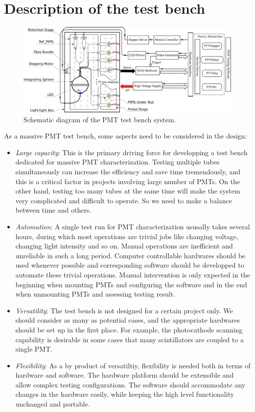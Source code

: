 \documentclass[5p, times]{elsarticle}
\begin{document}
\section{Description of the test bench}
\label{sec:description}

\begin{figure}
 \centering
 \includegraphics[width=160mm]{testbench_overview}
\caption{Schematic diagram of the PMT test bench system.}
\label{fig:testbench_overveiw}
\end{figure}

As a massive PMT test bench, some aspects need to be considered in the design:
\begin{itemize}
 \item \textit{Large capacity}: This is the primary driving force for developping a test bench dedicated for massive PMT characterization.
 Testing multiple tubes simultaneously can increase the efficiency and save time tremendously, and this is a critical factor in projects involving large number of PMTs. On the other hand, testing too many tubes at the same time will make the system very complicated and difficult to operate. So we need to make a balance between time and others.
 \item \textit{Automation}: A single test run for PMT characterization ususally takes several hours, during which most operations are trivial jobs like changing voltage, changing light intensity and so on.
 Manual operations are inefficient and unreliable in such a long period.
 Computer controllable hardwares should be used whenever possible and corresponding software should be developped to automate these trivial operations.
 Manual intervention is only expected in the beginning when mounting PMTs and configuring the software and in the end when unmounting PMTs and assessing testing result. 
 \item \textit{Versatility}: The test bench is not designed for a certain project only. We should consider as many as potential cases, and the appropriate hardwares should be set up in the first place.
 For example, the photocathode scanning capability is desirable in some cases that many scintillators are coupled to a single PMT. 
 \item \textit{Flexibility}: As a by product of versatiltiy, flexibility is needed both in terms of hardware and software.
 The hardware platform should be extensible and allow complex testing configurations.
 The software should accommodate any changes in the hardware easily, while keeping the high level functionality unchanged and portable. 
\end{itemize}
\end{document}

